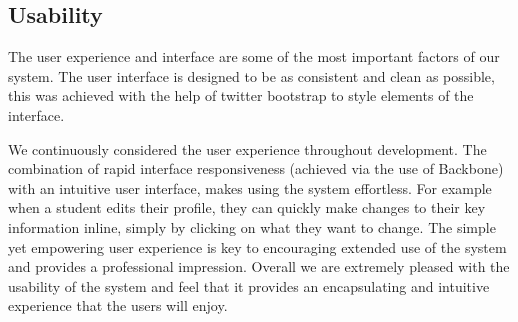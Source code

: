 \subsection{Usability}
The user experience and interface are some of the most important factors of our system. The user interface is designed to be as consistent and clean as possible, this was achieved with the help of twitter bootstrap to style elements of the interface.

We continuously considered the user experience throughout development. The combination of rapid interface responsiveness (achieved via the use of Backbone) with an intuitive user interface, makes using the system effortless. For example when a student edits their profile, they can quickly make changes to their key information inline, simply by clicking on what they want to change. The simple yet empowering user experience is key to encouraging extended use of the system and provides a professional impression. Overall we are extremely pleased with the usability of the system and feel that it provides an encapsulating and intuitive experience that the users will enjoy.